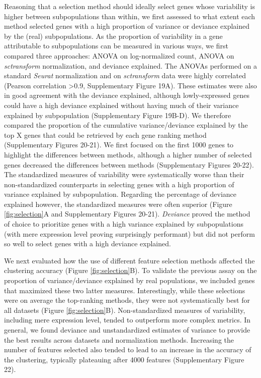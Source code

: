 \documentclass{bmcart}
\begin{document}
Reasoning that a selection method should ideally select genes whose variability is higher between subpopulations than within, we first assessed to what extent each method selected genes with a high proportion of variance or deviance explained by the (real) subpopulations. As the proportion of variability in a gene attributable to subpopulations can be measured in various ways, we first compared three approaches: ANOVA on log-normalized count, ANOVA on \textit{sctransform} normalization, and deviance explained. The ANOVAs performed on a standard \textit{Seurat} normalization and on \textit{sctransform} data were highly correlated ({\color{red}Pearson correlation >0.9,} Supplementary Figure 19A). These estimates were also in good agreement with the deviance explained, although lowly-expressed genes could have a high deviance explained without having much of their variance explained by subpopulation (Supplementary Figure 19B-D). We therefore compared the proportion of the cumulative variance/deviance explained by the top X genes that could be retrieved by each gene ranking method (Supplementary Figures 20-21). We first focused on the first 1000 genes to highlight the differences between methods, although a higher number of selected genes decreased the differences between methods (Supplementary Figures 20-22). The standardized measures of variability were systematically worse than their non-standardized counterparts in selecting genes with a high proportion of variance explained by subpopulation. Regarding the percentage of deviance explained however, the standardized measures were often superior (Figure \ref{fig:selection}A and Supplementary Figures 20-21). \textit{Deviance} proved the method of choice to prioritize genes with a high variance explained by subpopulations (with mere expression level proving surprisingly performant) but did not perform so well to select genes with a high deviance explained.

We next evaluated how the use of different feature selection methods affected the clustering accuracy (Figure \ref{fig:selection}B). To validate the previous assay on the proportion of variance/deviance explained by real populations, we included genes that maximized these two latter measures. Interestingly, while these selections were on average the top-ranking methods, they were not systematically best for all datasets (Figure \ref{fig:selection}B). Non-standardized measures of variability, including mere expression level, tended to outperform more complex metrics. In general, we found deviance and unstandardized estimates of variance to provide the best results across datasets and normalization methods. Increasing the number of features selected also {\color{red}tended to lead} to an increase in the accuracy of the clustering, typically plateauing after 4000 features (Supplementary Figure 22).
\end{document}
